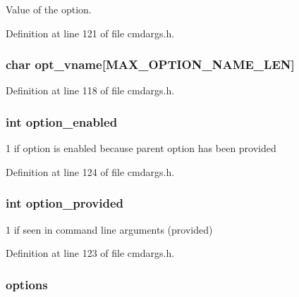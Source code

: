 Value of the option. 



Definition at line 121 of file cmdargs.\-h.

\hypertarget{struct__cmdarg_adb6a7f6cccad876d424ed56e78f7ed31}{
\subsubsection[{opt\-\_\-vname}]{\setlength{\rightskip}{0pt plus 5cm}char opt\-\_\-vname\mbox{[}{\bf M\-A\-X\-\_\-\-O\-P\-T\-I\-O\-N\-\_\-\-N\-A\-M\-E\-\_\-\-L\-E\-N}\mbox{]}}}\label{struct__cmdarg_adb6a7f6cccad876d424ed56e78f7ed31}


Definition at line 118 of file cmdargs.\-h.

\hypertarget{struct__cmdarg_a27ed6f1811d3a359323c9fa92a46c351}{
\subsubsection[{option\-\_\-enabled}]{\setlength{\rightskip}{0pt plus 5cm}int option\-\_\-enabled}}\label{struct__cmdarg_a27ed6f1811d3a359323c9fa92a46c351}


1 if option is enabled because parent option has been provided 



Definition at line 124 of file cmdargs.\-h.

\hypertarget{struct__cmdarg_aaf09a033a5ef37d5ce2e929df503ead3}{
\subsubsection[{option\-\_\-provided}]{\setlength{\rightskip}{0pt plus 5cm}int option\-\_\-provided}}\label{struct__cmdarg_aaf09a033a5ef37d5ce2e929df503ead3}


1 if seen in command line arguments (provided) 



Definition at line 123 of file cmdargs.\-h.

\hypertarget{struct__cmdarg_a73886e6f7ae7309944d9ee82137fbc63}{
\subsubsection[{options}]{ options}}\label{struct__cmdarg_a73886e6f7ae7309944d9ee82137fbc63}


